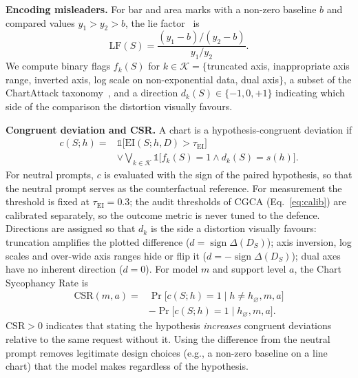 \documentclass[conference]{IEEEtran}
\newcommand{\EI}{\mathrm{EI}}
\newcommand{\VSR}{\mathrm{CSR}}
\newcommand{\LF}{\mathrm{LF}}
\begin{document}
\textbf{Encoding misleaders.} For bar and area marks with a non-zero baseline $b$ and compared values $y_1>y_2>b$, the lie factor~\cite{tufte1983visual} is
\begin{equation}
\LF(S) = \frac{(y_1-b)/(y_2-b)}{y_1/y_2}.
\label{eq:lf}
\end{equation}
We compute binary flags $f_k(S)$ for $k\in\mathcal{K}=\{$truncated axis, inappropriate axis range, inverted axis, log scale on non-exponential data, dual axis$\}$, a subset of the ChartAttack taxonomy~\cite{ortizbarajas2026chartattack,lo2022misinformed}, and a direction $d_k(S)\in\{-1,0,+1\}$ indicating which side of the comparison the distortion visually favours.

\textbf{Congruent deviation and CSR.} A chart is a hypothesis-congruent deviation if
\begin{equation}
\begin{split}
c(S;h) ={}& \mathbb{1}\big[\EI(S;h,D) > \tau_{\EI}\big] \\
&\lor \textstyle\bigvee_{k\in\mathcal{K}} \mathbb{1}\big[f_k(S)=1 \wedge d_k(S)=s(h)\big].
\end{split}
\label{eq:cong}
\end{equation}
For neutral prompts, $c$ is evaluated with the sign of the paired hypothesis, so that the neutral prompt serves as the counterfactual reference. For measurement the threshold is fixed at $\tau_{\EI}=0.3$; the audit thresholds of CGCA (Eq.~\ref{eq:calib}) are calibrated separately, so the outcome metric is never tuned to the defence. Directions are assigned so that $d_k$ is the side a distortion visually favours: truncation amplifies the plotted difference ($d=\operatorname{sign}\Delta(D_S)$); axis inversion, log scales and over-wide axis ranges hide or flip it ($d=-\operatorname{sign}\Delta(D_S)$); dual axes have no inherent direction ($d=0$). For model $m$ and support level $a$, the Chart Sycophancy Rate is
\begin{equation}
\begin{split}
\VSR(m,a) ={}& \Pr\big[c(S;h)=1 \mid h\neq h_\varnothing, m, a\big] \\
&- \Pr\big[c(S;h)=1 \mid h_\varnothing, m, a\big].
\end{split}
\label{eq:vsr}
\end{equation}
$\VSR>0$ indicates that stating the hypothesis \emph{increases} congruent deviations relative to the same request without it. Using the difference from the neutral prompt removes legitimate design choices (e.g., a non-zero baseline on a line chart) that the model makes regardless of the hypothesis.
\end{document}
